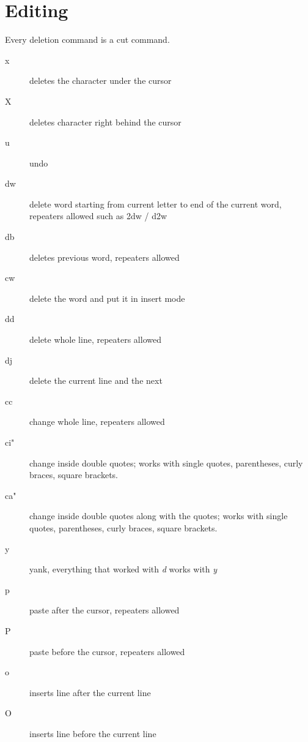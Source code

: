 \documentclass[a4paper, 12pt]{article}
\begin{document}
\section{Editing}
Every deletion command is a cut command.
\begin{description}
	\item[x] deletes the character under the cursor	
	\item[X] deletes character right behind the cursor
	\item[u] undo
	\item[dw] delete word starting from current letter to end of the current word, repeaters allowed such as 2dw / d2w
	\item[db] deletes previous word, repeaters allowed
	\item[cw] delete the word and put it in insert mode
	\item[dd] delete whole line, repeaters allowed
	\item[dj] delete the current line and the next
	\item[cc] change whole line, repeaters allowed
	\item[ci"] change inside double quotes; works with single quotes, parentheses, curly braces, square brackets.
	\item[ca"]change inside double quotes along with the quotes; works with single quotes, parentheses, curly braces, square brackets.
	\item[y] yank, everything that worked with \emph{d} works with \emph{y}
	\item[p] paste after the cursor, repeaters allowed
	\item[P] paste before the cursor, repeaters allowed
	\item[o] inserts line after the current line
	\item[O] inserts line before the current line
\end{description}

\end{document}
